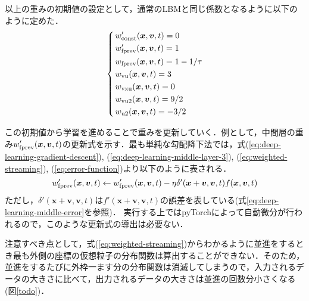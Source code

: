 以上の重みの初期値の設定として，通常のLBMと同じ係数となるように以下のように定めた．
\begin{equation}
  \left\{ \,
      \begin{aligned}
      & w'_{\rm{const}}(\bm{x}, \bm{v}, t) = 0 \\
      & w'_{\rm{fprev}}(\bm{x}, \bm{v}, t) = 1 \\
      & w_{\rm{fprev}}(\bm{x}, \bm{v}, t) = 1 - 1/\tau \\
      & w_{\rm{vu}}(\bm{x}, \bm{v}, t) = 3 \\
      & w_{\rm{vxu}}(\bm{x}, \bm{v}, t) = 0 \\
      & w_{\rm{vu2}}(\bm{x}, \bm{v}, t) = 9/2 \\
      & w_{\rm{u2}}(\bm{x}, \bm{v}, t) = -3/2
      \end{aligned}
  \right.
\end{equation}

この初期値から学習を進めることで重みを更新していく．例として，中間層の重み$w'_{\rm{fprev}}(\bm{x}, \bm{v}, t)$の更新式を示す．最も単純な勾配降下法では，式(\ref{eq:deep-learning-gradient-descent}), (\ref{eq:deep-learning-middle-layer-3}), (\ref{eq:weighted-streaming}), (\ref{eq:error-function})より以下のように表される．
\begin{equation}
  w'_{\rm{fprev}}(\bm{x}, \bm{v}, t) \leftarrow
  w'_{\rm{fprev}}(\bm{x}, \bm{v}, t) 
  - \eta \delta'(\bm{x} + \bm{v}, \bm{v}, t) f(\bm{x}, \bm{v}, t)
  \label{eq:weight-fprev-update}
\end{equation}
ただし，$\delta'(\bm{x} + \bm{v}, \bm{v}, t)$は$f'(\bm{x} + \bm{v}, \bm{v}, t)$の誤差を表している(式\ref{eq:deep-learning-middle-error}を参照)．
実行する上ではpyTorchによって自動微分が行われるので，このような更新式の導出は必要ない．

注意すべき点として，式(\ref{eq:weighted-streaming})からわかるように並進をするとき最も外側の座標の仮想粒子の分布関数は算出することができない．そのため，並進をするたびに外枠一ます分の分布関数は消滅してしまうので，入力されるデータの大きさに比べて，出力されるデータの大きさは並進の回数分小さくなる(図\ref{todo})．

